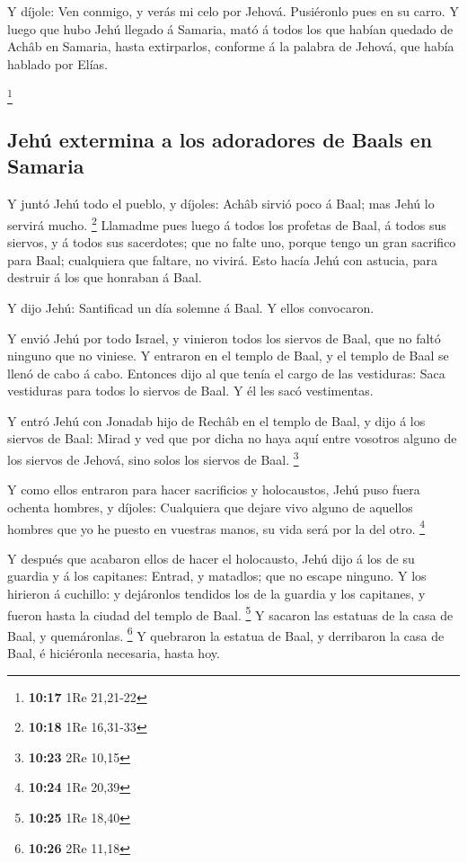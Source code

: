  Y díjole: Ven conmigo, y verás mi celo por Jehová.
Pusiéronlo pues en su carro.  Y luego que hubo Jehú
llegado á Samaria, mató á todos los que habían quedado de Achâb en
Samaria, hasta extirparlos, conforme á la palabra de Jehová, que había
hablado por Elías.

\footnote{\textbf{10:17} 1Re 21,21-22}

\hypertarget{jehuxfa-extermina-a-los-adoradores-de-baals-en-samaria}{%
\subsection{Jehú extermina a los adoradores de Baals en
Samaria}\label{jehuxfa-extermina-a-los-adoradores-de-baals-en-samaria}}

 Y juntó Jehú todo el pueblo, y díjoles: Achâb sirvió
poco á Baal; mas Jehú lo servirá mucho. \footnote{\textbf{10:18} 1Re
  16,31-33}  Llamadme pues luego á todos los profetas de
Baal, á todos sus siervos, y á todos sus sacerdotes; que no falte uno,
porque tengo un gran sacrifico para Baal; cualquiera que faltare, no
vivirá. Esto hacía Jehú con astucia, para destruir á los que honraban á
Baal.

 Y dijo Jehú: Santificad un día solemne á Baal. Y ellos
convocaron.

 Y envió Jehú por todo Israel, y vinieron todos los
siervos de Baal, que no faltó ninguno que no viniese. Y entraron en el
templo de Baal, y el templo de Baal se llenó de cabo á cabo.
 Entonces dijo al que tenía el cargo de las vestiduras:
Saca vestiduras para todos lo siervos de Baal. Y él les sacó
vestimentas.

 Y entró Jehú con Jonadab hijo de Rechâb en el templo de
Baal, y dijo á los siervos de Baal: Mirad y ved que por dicha no haya
aquí entre vosotros alguno de los siervos de Jehová, sino solos los
siervos de Baal. \footnote{\textbf{10:23} 2Re 10,15}

 Y como ellos entraron para hacer sacrificios y
holocaustos, Jehú puso fuera ochenta hombres, y díjoles: Cualquiera que
dejare vivo alguno de aquellos hombres que yo he puesto en vuestras
manos, su vida será por la del otro. \footnote{\textbf{10:24} 1Re 20,39}

 Y después que acabaron ellos de hacer el holocausto,
Jehú dijo á los de su guardia y á los capitanes: Entrad, y matadlos; que
no escape ninguno. Y los hirieron á cuchillo: y dejáronlos tendidos los
de la guardia y los capitanes, y fueron hasta la ciudad del templo de
Baal. \footnote{\textbf{10:25} 1Re 18,40}  Y sacaron las
estatuas de la casa de Baal, y quemáronlas. \footnote{\textbf{10:26} 2Re
  11,18}  Y quebraron la estatua de Baal, y derribaron la
casa de Baal, é hiciéronla necesaria, hasta hoy.

